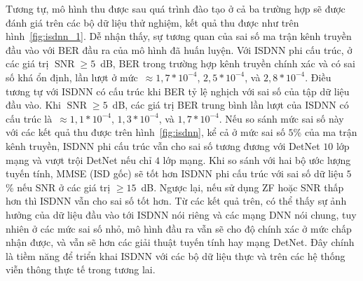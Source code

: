 Tương tự, mô hình thu được sau quá trình đào tạo ở cả ba trường hợp sẽ được đánh giá trên các bộ dữ liệu thử nghiệm, kết quả thu được như trên hình~\ref{fig:isdnn_1}. Dễ nhận thấy, sự tương quan của sai số ma trận kênh truyền đầu vào với BER đầu ra của mô hình đã huấn luyện. Với ISDNN phi cấu trúc, ở các giá trị $\operatorname{SNR}\ge 5$~dB, BER trong trường hợp kênh truyền chính xác và có sai số khá ổn định, lần lượt ở mức~$\approx 1,7 * 10^{-4}$, $2,5* 10^{-4}$, và $2,8* 10^{-4}$. 
Điều tương tự với ISDNN có cấu trúc khi BER tỷ lệ nghịch với sai số của tập dữ liệu đầu vào. Khi $\operatorname{SNR}\ge 5$~dB, các giá trị BER trung bình lần lượt của ISDNN có cấu trúc là~$\approx 1,1 * 10^{-4}$, $1,3* 10^{-4}$, và $1,7* 10^{-4}$. 
Nếu so sánh mức sai số này với các kết quả thu được trên hình~\ref{fig:isdnn}, kể cả ở mức sai số $5$\% của ma trận kênh truyền, ISDNN phi cấu trúc vẫn cho sai số tương đương với DetNet $10$ lớp mạng và vượt trội DetNet nếu chỉ $4$ lớp mạng. Khi so sánh với hai bộ ước lượng tuyến tính, MMSE (ISD gốc) sẽ tốt hơn ISDNN phi cấu trúc với sai số dữ liệu $5$\% nếu SNR ở các giá trị $\ge 15$~dB. Ngược lại, nếu sử dụng ZF hoặc SNR thấp hơn thì ISDNN vẫn cho sai số tốt hơn. Từ các kết quả trên, có thể thấy sự ảnh hưởng của dữ liệu đầu vào tới ISDNN nói riêng và các mạng DNN nói chung, tuy nhiên ở các mức sai số nhỏ, mô hình đầu ra vẫn sẽ cho độ chính xác ở mức chấp nhận được, và vẫn sẽ hơn các giải thuật tuyến tính hay mạng DetNet. Đây chính là tiềm năng để triển khai ISDNN với các bộ dữ liệu thực và trên các hệ thống viễn thông thực tế trong tương lai.
